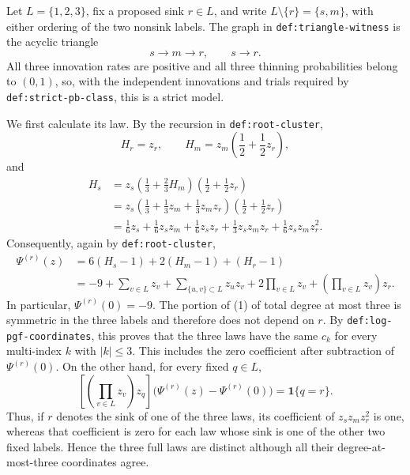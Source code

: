 Let \(L=\{1,2,3\}\), fix a proposed sink \(r\in L\), and write \(L\setminus\{r\}=\{s,m\}\), with either ordering of the two nonsink labels.  The graph in \texttt{def:triangle-witness} is the acyclic triangle
\[
s\longrightarrow m\longrightarrow r,
\qquad s\longrightarrow r.
\]
All three innovation rates are positive and all three thinning probabilities belong to \((0,1)\), so, with the independent innovations and trials required by \texttt{def:strict-pb-class}, this is a strict model.

We first calculate its law.  By the recursion in \texttt{def:root-cluster},
\[
H_r=z_r,
\qquad
H_m=z_m\left(\frac12+\frac12z_r\right),
\]
and
\[
\begin{aligned}
H_s
&=z_s\left(\frac13+\frac23H_m\right)
          \left(\frac12+\frac12z_r\right)\\
&=z_s\left(\frac13+\frac13z_m+\frac13z_mz_r\right)
          \left(\frac12+\frac12z_r\right)\\
&=\frac16z_s+\frac16z_sz_m+\frac16z_sz_r
  +\frac13z_sz_mz_r+\frac16z_sz_mz_r^2.
\end{aligned}
\]
Consequently, again by \texttt{def:root-cluster},
\[
\begin{aligned}
\Psi^{(r)}(z)
&=6(H_s-1)+2(H_m-1)+(H_r-1)\\
&=-9+\sum_{v\in L}z_v
  +\sum_{\{u,v\}\subset L}z_uz_v
  +2\prod_{v\in L}z_v
  +\left(\prod_{v\in L}z_v\right)z_r.
\end{aligned}
\tag{1}
\]
In particular, \(\Psi^{(r)}(0)=-9\).  The portion of (1) of total degree at most three is symmetric in the three labels and therefore does not depend on \(r\).  By \texttt{def:log-pgf-coordinates}, this proves that the three laws have the same \(c_k\) for every multi-index \(k\) with \(|k|\leq 3\).  This includes the zero coefficient after subtraction of \(\Psi^{(r)}(0)\).  On the other hand, for every fixed \(q\in L\),
\[
\left[\left(\prod_{v\in L}z_v\right)z_q\right]
\bigl(\Psi^{(r)}(z)-\Psi^{(r)}(0)\bigr)
=\mathbf 1\{q=r\}.
\tag{2}
\]
Thus, if \(r\) denotes the sink of one of the three laws, its coefficient of \(z_sz_mz_r^2\) is one, whereas that coefficient is zero for each law whose sink is one of the other two fixed labels.  Hence the three full laws are distinct although all their degree-at-most-three coordinates agree.

